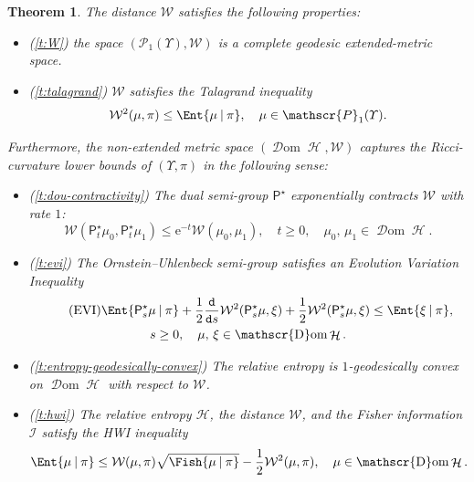 \documentclass[10pt]{amsart}
\newtheorem*{theorem*}{Theorem}
\theoremstyle{definition}
\theoremstyle{remark}
\newcommand{\given}[1][]{%
\nonscript\:#1\vert
\allowbreak
\nonscript\:
\mathopen{}}
\DeclareMathOperator{\ent}{\mathcal{H}}
\DeclareMathOperator{\dom}{\mathscr{D}om}
\begin{document}
\begin{theorem*}
The distance $\mathcal{W}$ satisfies the following properties:
\begin{itemize}[wide]
\item (\cref{t:W})
the space $(\mathscr{P}_{1}(\varUpsilon),\mathcal{W})$ is a complete geodesic extended-metric space.
\item (\cref{t:talagrand}) $\mathcal{W}$ satisfies the \emph{Talagrand inequality}
\begin{equation*}
\mathcal{W}^{2}(\mu, \pi) \leq \Ent{ \mu \given \pi}, \quad \mu \in \mathscr{P}_{1}(\varUpsilon).
\end{equation*}
\end{itemize}

Furthermore, the non-extended metric space $(\dom \ent, \mathcal{W})$ captures the Ricci-curvature lower bounds of $(\varUpsilon, \pi)$ in the following sense:
\begin{itemize}[wide]
\item (\cref{t:dou-contractivity})
The dual semi-group $\mathsf{P}^{\star}$ exponentially contracts $\mathcal{W}$ with rate $1$:
\begin{equation*}
\mathcal{W}(\mathsf{P}^{\star}_{t} \mu_{0}, \mathsf{P}^{\star}_{t} \mu_{1}) \leq \mathrm{e}^{-t} \mathcal{W}(\mu_{0}, \mu_{1}), \quad t \geq 0, \quad \mu_0,\, \mu_1 \in \dom \ent.
\end{equation*}

\item (\cref{t:evi}) The Ornstein--Uhlenbeck semi-group satisfies an \emph{Evolution Variation Inequality}
\begin{multline}\tag{EVI}\label{e:evi-intro}
\Ent{\mathsf{P}^{\star}_{s} \mu \given \pi} + \frac{1}{2} \frac{\mathtt{d}}{\mathtt{d} s} \mathcal{W}^{2}(\mathsf{P}^{\star}_{s} \mu, \xi) + \frac{1}{2} \mathcal{W}^{2}(\mathsf{P}^{\star}_{s} \mu, \xi) \leq \Ent{\xi \given \pi}, \\
s \geq 0, \quad \mu,\,\xi \in \dom \ent.
\end{multline}

\item (\cref{t:entropy-geodesically-convex})
The relative entropy is $1$-geodesically convex on $\dom \ent$ with respect to $\mathcal{W}$.

\item (\cref{t:hwi})
The relative entropy $\mathcal{H}$, the distance $\mathcal{W}$, and the Fisher information $\mathcal{I}$ satisfy the HWI inequality
\begin{equation*}
\Ent{ \mu \given \pi } \leq \mathcal{W}(\mu, \pi) \sqrt{\Fish{ \mu \given \pi }} - \frac{1}{2} \mathcal{W}^{2}(\mu, \pi), \quad \mu \in \dom \ent.
\end{equation*}
\end{itemize}
\end{theorem*}
\end{document}
